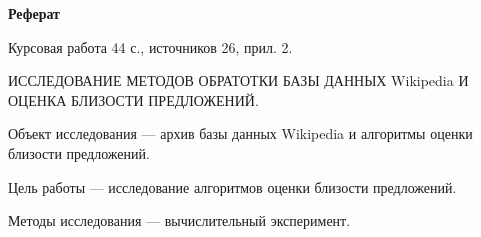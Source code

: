 \begin{center}
	\textbf{Реферат}
\end{center}

      Курсовая работа  44  с., источников  26, прил. 2.

ИССЛЕДОВАНИЕ МЕТОДОВ ОБРАТОТКИ БАЗЫ ДАННЫХ Wikipedia И ОЦЕНКА БЛИЗОСТИ ПРЕДЛОЖЕНИЙ. 

Объект исследования --- архив базы данных Wikipedia и алгоритмы оценки близости предложений.
     
Цель работы --- исследование алгоритмов оценки близости предложений.

Методы исследования --- вычислительный эксперимент.
